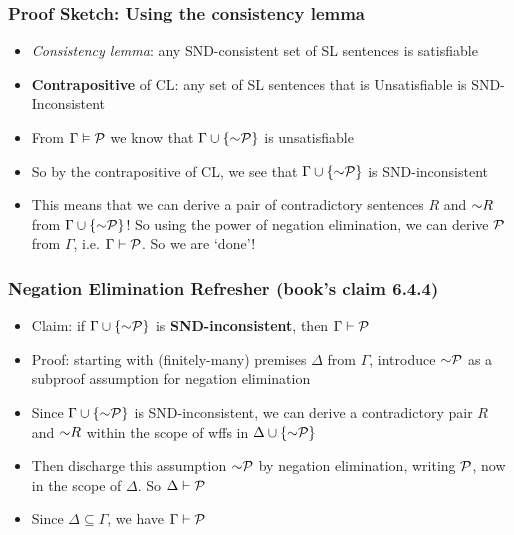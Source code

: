 \begin{frame}
\frametitle{Proof Sketch: Using the consistency lemma}

\begin{itemize}[<+->]

\item \emph{Consistency lemma}: any SND-consistent set of SL sentences is satisfiable

\item \textbf{\textcolor{OGlyallpink}{Contrapositive}} of CL: any set of SL sentences that is \textcolor{OGlyallpink}{Un}satisfiable is SND-\textcolor{OGlyallpink}{In}consistent

\item From  $\Gamma \vDash \mathcal{P}$ we know that $\Gamma \cup \{\enot \metav{P}\}$ is unsatisfiable

\item So by the contrapositive of CL, we see that $\Gamma \cup \{\enot \metav{P}\}$ is SND-inconsistent

\item This means that we can derive a pair of contradictory sentences $R$ and $\enot R$ from $\Gamma \cup \{\enot \metav{P}\}$! So using the power of negation elimination, we can derive $\mathcal{P}$ from $\Gamma$, i.e. $\Gamma \vdash \mathcal{P}$. So we are `done'! 

\end{itemize}
\end{frame}

\begin{frame}
\frametitle{Negation Elimination Refresher (book's claim 6.4.4)}

\begin{itemize}[<+->]

\item Claim: if $\Gamma \cup \{\enot \metav{P}\}$ is \textbf{\textcolor{OGlyallpink}{SND-inconsistent}}, then $\Gamma \vdash \mathcal{P}$

\item Proof: starting with (finitely-many) premises $\Delta$ from $\Gamma$, introduce $\enot \metav{P}$ as a subproof assumption for negation elimination

\item Since $\Gamma \cup \{\enot \metav{P}\}$ is SND-inconsistent, we can derive a contradictory pair $R$ and $\enot R$ within the scope of wffs in $\Delta \cup \{\enot \metav{P}\}$

\item Then discharge this assumption $\enot \metav{P}$ by negation elimination, writing $\mathcal{P}$, now in the scope of $\Delta$. So $\Delta \vdash \mathcal{P}$

\item Since $\Delta \subseteq \Gamma$, we have $\Gamma \vdash \mathcal{P}$




\end{itemize}
\end{frame}

